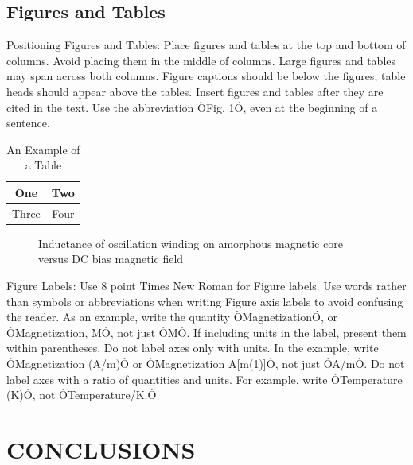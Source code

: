 \documentclass[letterpaper, 10 pt, conference]{ieeeconf}  %
\theoremstyle{tight}
\begin{document}
\subsection{Figures and Tables}

Positioning Figures and Tables: Place figures and tables at the top and bottom of columns. Avoid placing them in the middle of columns. Large figures and tables may span across both columns. Figure captions should be below the figures; table heads should appear above the tables. Insert figures and tables after they are cited in the text. Use the abbreviation ÒFig. 1Ó, even at the beginning of a sentence.

\begin{table}[h]
\caption{An Example of a Table}
\label{table_example}
\begin{center}
\begin{tabular}{|c||c|}
\hline
One & Two\\
\hline
Three & Four\\
\hline
\end{tabular}
\end{center}
\end{table}


   \begin{figure}[thpb]
      \centering
      \caption{Inductance of oscillation winding on amorphous
       magnetic core versus DC bias magnetic field}
      \label{figurelabel}
   \end{figure}
   

Figure Labels: Use 8 point Times New Roman for Figure labels. Use words rather than symbols or abbreviations when writing Figure axis labels to avoid confusing the reader. As an example, write the quantity ÒMagnetizationÓ, or ÒMagnetization, MÓ, not just ÒMÓ. If including units in the label, present them within parentheses. Do not label axes only with units. In the example, write ÒMagnetization (A/m)Ó or ÒMagnetization {A[m(1)]}Ó, not just ÒA/mÓ. Do not label axes with a ratio of quantities and units. For example, write ÒTemperature (K)Ó, not ÒTemperature/K.Ó

\section{CONCLUSIONS}
\end{document}
